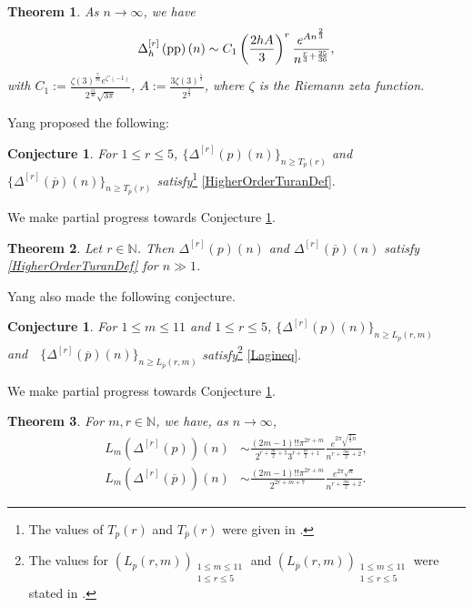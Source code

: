 \documentclass[11pt,reqno,a4paper]{amsart}
\newcommand{\z}{\zeta}
\renewcommand{\(}{\left\(}
\renewcommand{\)}{\right\)}
\newcommand{\pa}[2]{\left(\frac{#1}{#2}\right)}
\numberwithin{equation}{section}
\theoremstyle{plain}
\newtheorem{theorem}{Theorem}[section]
\theoremstyle{definition} %
\newcounter{specialstatement}
\newtheorem{conjecture}[specialstatement]{Conjecture}
\numberwithin{equation}{section}
\begin{document}
\begin{theorem}\label{mshiftthm}
As $n\to \infty$, we have 
	\[
	\Delta^{[r]}_{h}\left(\textup{pp}\right)(n)\sim C_1\left(\frac{2h A}{3}\right)^r\frac{ e^{A n^{\frac 23}} }{n^{\frac r3+\frac{25}{36}}},
	\]
with $C_1:=\frac{\z(3)^{\frac{7}{36}}e^{\z'(-1)}}{2^{\frac{11}{36}}\sqrt{3\pi}}$, $A:=\frac{3\z(3)^{\frac 13}}{2^{\frac 23}}$, where $\z$ is the Riemann zeta function.
\end{theorem}
 Yang \cite[Conjecture 5.2 (1)]{Yang} proposed the following:
 \begin{conjecture}\label{Yangconj}
{\it For $1\le r\le 5$, $\{\Delta^{[r]}(p)(n)\}_{n\ge T_p(r)}$ and $\{\Delta^{[r]}(\overline{p})(n)\}_{n\ge T_{\overline{p}}(r)}$ satisfy}\footnote{The values of $T_p(r)$ and  $T_{\overline{p}}(r)$ were given in \cite[Table 5]{Yang}.} \eqref{HigherOrderTuranDef}.
\end{conjecture}



We make partial progress towards  Conjecture \ref{Yangconj}.

 

\begin{theorem}\label{Jensencor1}
	Let $r\in \mathbb{N}$. Then $\Delta^{[r]}(p)(n)$ and $\Delta^{[r]}(\overline{p})(n)$ satisfy \eqref{HigherOrderTuranDef} for $n\!\gg\!1$.	
\end{theorem}





Yang \cite[Conjecture 5.1 (1)]{Yang} also made the following conjecture.
\begin{conjecture}\label{Yangconj1}
{\it For $1\le m\le 11$ and $1\le r\le 5$, $\{\Delta^{[r]}(p)(n)\}_{n\ge L_p(r,m)}$ and}\ \ $\{\Delta^{[r]}(\overline{p})(n)\}_{n\ge L_{\overline{p}}(r,m)}$ {\it satisfy}\footnote{The values for $(L_{p}(r,m))_{\substack{1\le m\le 11\\1\le r\le 5}}$ and $(L_{\overline{p}}(r,m))_{\substack{1\le m\le 11\\1\le r\le 5}}$ were stated in \cite[Table 1 and 2]{Yang}.} \eqref{Lagineq}.
\end{conjecture}

 We make partial progress towards  Conjecture \ref{Yangconj1}.

\begin{theorem}\label{Lagthm1}
	For $m, r\in \mathbb{N}$, we have, as $n\to \infty$,
	\begin{align*}
	L_m\left(\Delta^{[r]}(p)\right)(n)&\sim %
	\frac{(2m-1)!!\pi^{2r+m}}{2^{r+\frac m2+5}3^{r+\frac m2+1} }\frac{e^{2\pi\sqrt{\frac{2}{3}n}}}{n^{r+\frac{3m}{2}+2}},\\
	L_m\left(\Delta^{[r]}(\overline{p})\right)(n)&\sim %
	\frac{(2m-1)!!\pi^{2r+m}}{2^{2r+m+7} }\frac{e^{2\pi\sqrt{n}}}{n^{r+\frac{3m}{2}+2}}.
	\end{align*}
\end{theorem}
\end{document}
